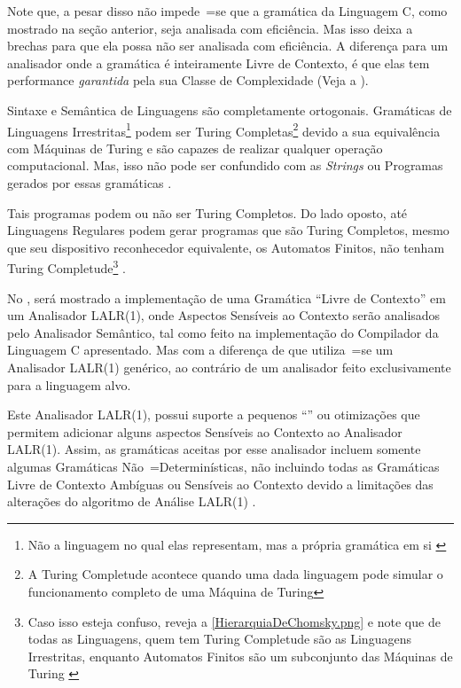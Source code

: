     Note que,
    a pesar disso não impede~=se que a gramática da Linguagem C,
    como mostrado na seção anterior,
    seja analisada com eficiência.
    Mas isso deixa a brechas para que ela possa não ser analisada com eficiência.
    A diferença para um analisador onde a gramática é inteiramente Livre de Contexto,
    é que elas tem performance \textit{garantida} pela sua Classe de Complexidade (Veja a ).

    Sintaxe e
    Semântica de Linguagens são completamente ortogonais.
    Gramáticas de Linguagens Irrestritas\footnote{
    Não a linguagem no qual elas representam,
    mas a própria gramática em si \cite{finiteAutomataTuringComplete}
    }
    podem ser Turing Completas\footnote{
    A Turing Completude acontece quando uma dada linguagem pode simular o funcionamento completo de uma Máquina de Turing
    }
    devido a sua equivalência com Máquinas de Turing e
    são capazes de realizar qualquer operação computacional.
    Mas,
    isso não pode ser confundido com as \textit{Strings} ou
    Programas gerados por essas gramáticas \cite{areThereDomainSpecificLanguages}.

    Tais programas podem ou
    não ser Turing Completos.
    Do lado oposto,
    até Linguagens Regulares podem gerar programas que são Turing Completos,
    mesmo que seu dispositivo reconhecedor equivalente,
    os Automatos Finitos,
    não tenham Turing Completude\footnote{
    Caso isso esteja confuso,
    reveja a \autoref{HierarquiaDeChomsky.png} e
    note que de todas as Linguagens,
    quem tem Turing Completude são as Linguagens Irrestritas,
    enquanto Automatos Finitos são um subconjunto das Máquinas de Turing \cite{finiteAutomataTuringComplete}
    }
    \cite{turingCompleteRegularLanguages,finiteAutomataTuringComplete}.

    No ,
    será mostrado a implementação de uma Gramática ``Livre de Contexto'' em um Analisador LALR(1),
    onde Aspectos Sensíveis ao Contexto serão analisados pelo Analisador Semântico,
    tal como feito na implementação do Compilador da Linguagem C apresentado.
    Mas com a diferença de que utiliza~=se um Analisador LALR(1) genérico,
    ao contrário de um analisador feito exclusivamente para a linguagem alvo.

    Este Analisador LALR(1),
    possui suporte a pequenos ``\textit{}'' ou
    otimizações que permitem adicionar alguns aspectos Sensíveis ao Contexto ao Analisador LALR(1).
    Assim,
    as gramáticas aceitas por esse analisador incluem somente algumas Gramáticas Não~=Determinísticas,
    não incluindo todas as Gramáticas Livre de Contexto Ambíguas ou
    Sensíveis ao Contexto devido a limitações das alterações do algoritmo de Análise LALR(1) \cite{larkContextualLexer}.


